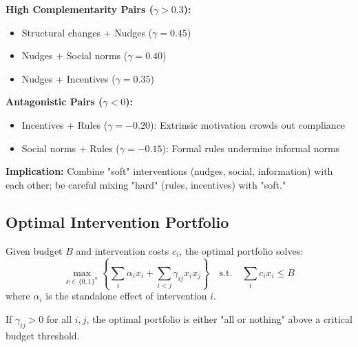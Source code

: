 \begin{tcolorbox}[colback=yellow!5!white,colframe=yellow!75!black,title=\textbf{Intervention Complementarity Patterns}]

\textbf{High Complementarity Pairs ($\gamma > 0.3$):}
\begin{itemize}[noitemsep]
    \item Structural changes + Nudges ($\gamma = 0.45$)
    \item Nudges + Social norms ($\gamma = 0.40$)
    \item Nudges + Incentives ($\gamma = 0.35$)
\end{itemize}

\textbf{Antagonistic Pairs ($\gamma < 0$):}
\begin{itemize}[noitemsep]
    \item Incentives + Rules ($\gamma = -0.20$): Extrinsic motivation crowds out compliance
    \item Social norms + Rules ($\gamma = -0.15$): Formal rules undermine informal norms
\end{itemize}

\textbf{Implication:} Combine "soft" interventions (nudges, social, information) with each other; be careful mixing "hard" (rules, incentives) with "soft."
\end{tcolorbox}

\subsection{Optimal Intervention Portfolio}

\begin{theorem}
Given budget $B$ and intervention costs $c_i$, the optimal portfolio solves:
\begin{equation}
\max_{x \in \{0,1\}^n} \left\{ \sum_i \alpha_i x_i + \sum_{i<j} \gamma_{ij} x_i x_j \right\} \quad \text{s.t.} \quad \sum_i c_i x_i \leq B
\end{equation}
where $\alpha_i$ is the standalone effect of intervention $i$.
\end{theorem}

\begin{corollary}
If $\gamma_{ij} > 0$ for all $i,j$, the optimal portfolio is either "all or nothing" above a critical budget threshold.
\end{corollary}

